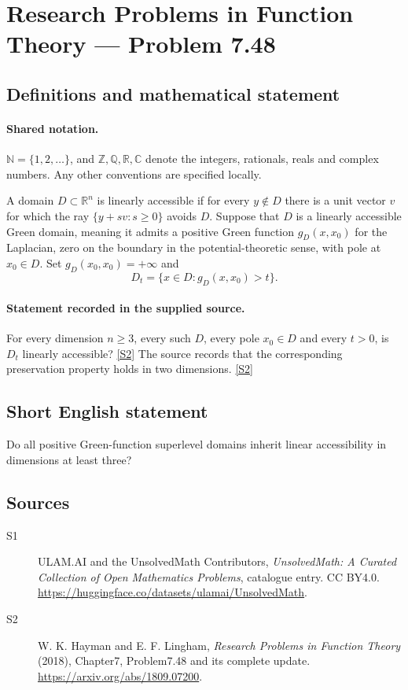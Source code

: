 \documentclass[11pt]{article}
\newcommand{\sref}[2]{\hyperlink{source:#1:#2}{[S#2]}}
\begin{document}
\section{Research Problems in Function Theory — Problem 7.48}\label{statement}

\subsection{Definitions and mathematical statement}

\paragraph{Shared notation.}$\mathbb N=\{1,2,\ldots\}$, and $\mathbb Z,\mathbb Q,\mathbb R,\mathbb C$ denote the integers, rationals, reals and complex numbers. Any other conventions are specified locally.


A domain $D\subset\mathbb R^n$ is linearly accessible if for every $y\notin D$ there is a unit vector $v$ for which the ray $\{y+sv:s\ge0\}$ avoids $D$. Suppose that $D$ is a linearly accessible Green domain, meaning it admits a positive Green function $g_D(x,x_0)$ for the Laplacian, zero on the boundary in the potential-theoretic sense, with pole at $x_0\in D$. Set $g_D(x_0,x_0)=+\infty$ and
\[D_t=\{x\in D:g_D(x,x_0)>t\}.\]

\paragraph{Statement recorded in the supplied source.}
For every dimension $n\ge3$, every such $D$, every pole $x_0\in D$ and every $t>0$, is $D_t$ linearly accessible? \sref{statement}{2}
The source records that the corresponding preservation property holds in two dimensions. \sref{statement}{2}
\subsection{Short English statement}
Do all positive Green-function superlevel domains inherit linear accessibility in dimensions at least three?
\subsection{Sources}
\begin{description}
\item[\hypertarget{source:statement:1}{S1}] ULAM.AI and the UnsolvedMath Contributors, \emph{UnsolvedMath: A Curated Collection of Open Mathematics Problems}, catalogue entry. CC BY4.0. \url{https://huggingface.co/datasets/ulamai/UnsolvedMath}.
\item[\hypertarget{source:statement:2}{S2}] W. K. Hayman and E. F. Lingham, \emph{Research Problems in Function Theory} (2018), Chapter7, Problem7.48 and its complete update. \url{https://arxiv.org/abs/1809.07200}.
\end{description}
\label{end:statement}
\end{document}
